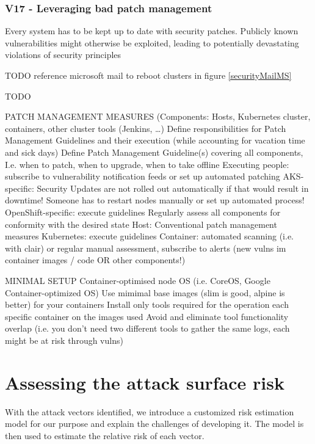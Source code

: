 \subsection{V17 - Leveraging bad patch management}
Every system has to be kept up to date with  security patches. Publicly known vulnerabilities might otherwise be exploited, leading to potentially devastating violations of security principles

TODO reference microsoft mail to reboot clusters in figure \ref{securityMailMS}

TODO

PATCH MANAGEMENT MEASURES
(Components: Hosts, Kubernetes cluster, containers, other cluster tools (Jenkins, …)
	Define responsibilities for Patch Management Guidelines and their execution (while accounting for vacation time and sick days)
	Define Patch Management Guideline(s) covering all components, I.e. when to patch, when to upgrade, when to take offline
	Executing people: subscribe to vulnerability notification feeds or set up automated patching
	AKS-specific: Security Updates are not rolled out automatically if that would result in downtime! Someone has to restart nodes manually or set up automated process!
	OpenShift-specific: execute guidelines
	Regularly assess all components for conformity with the desired state
	Host: Conventional patch management measures
	Kubernetes: execute guidelines
	Container: automated scanning (i.e. with clair) or regular manual assessment, subscribe to alerts (new vulns im container images / code OR other components!)
	
MINIMAL SETUP	
	Container-optimised node OS (i.e. CoreOS, Google Container-optimized OS)
	Use mimimal base images (slim is good, alpine is better) for your containers
	Install only tools required for the operation each specific container on the images used
	Avoid and eliminate tool functionality overlap (i.e. you don’t need two different tools to gather the same logs, each might be at risk through vulns)


\chapter{Assessing the attack surface risk}

With the attack vectors identified, we introduce a customized risk estimation model for our purpose and explain the challenges of developing it. The model is then used to estimate the relative risk of each vector.


